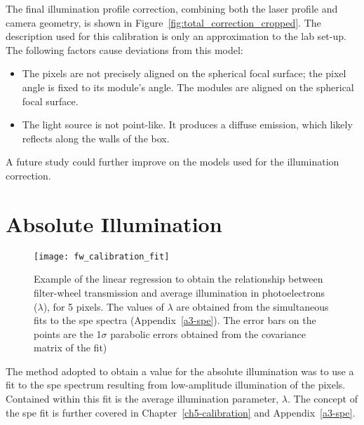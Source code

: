 The final illumination profile correction, combining both the laser profile and camera geometry, is shown in Figure~\ref{fig:total_correction_cropped}. The description used for this calibration is only an approximation to the lab set-up. The following factors cause deviations from this model:
\begin{itemize}
\item The pixels are not precisely aligned on the spherical focal surface; the pixel angle is fixed to its module's angle. The modules are aligned on the spherical focal surface.
\item The light source is not point-like. It produces a diffuse emission, which likely reflects along the walls of the box.
\end{itemize}
A future study could further improve on the models used for the illumination correction.

\section{Absolute Illumination} \label{section:absolute_illumination}

\begin{figure}
	\centering
    \texttt{[image: fw\_calibration\_fit]} 
	\caption[Obtaining relationship between filter-wheel transmission and average illumination.]{Example of the linear regression to obtain the relationship between filter-wheel transmission and average illumination in photoelectrons ($\lambda$), for 5 pixels. The values of $\lambda$ are obtained from the simultaneous fits to the \gls{spe} spectra (Appendix~\ref{a3-spe}). The error bars on the points are the \si{1}{$\sigma$} parabolic errors obtained from the covariance matrix of the fit)}
	\label{fig:fw_calibration_fit}
\end{figure}

The method adopted to obtain a value for the absolute illumination was to use a fit to the \gls{spe} spectrum resulting from low-amplitude illumination of the pixels. Contained within this fit is the average illumination parameter, $\lambda$. The concept of the \gls{spe} fit is further covered in Chapter~\ref{ch5-calibration} and Appendix~\ref{a3-spe}.

